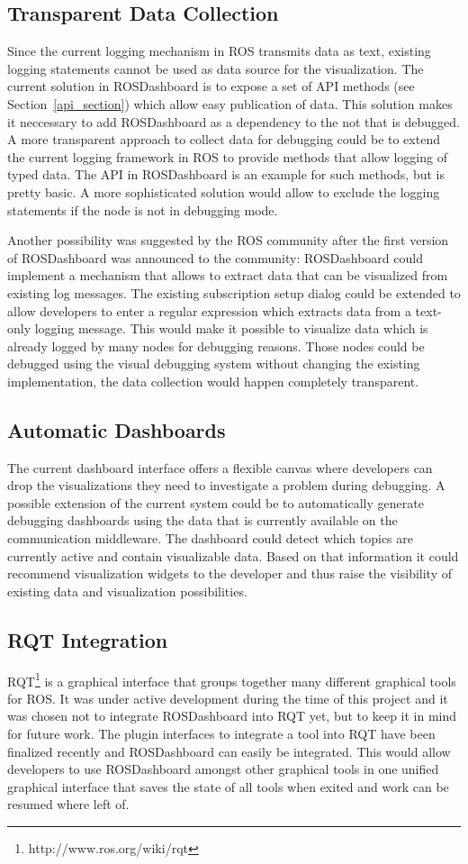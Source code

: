 \subsection{Transparent Data Collection}
Since the current logging mechanism in ROS transmits data as text, existing logging statements cannot be used as data source for the visualization. The current solution in ROSDashboard is to expose a set of API methods (see Section~\ref{api_section}) which allow easy publication of data. This solution makes it neccessary to add ROSDashboard as a dependency to the not that is debugged. A more transparent approach to collect data for debugging could be to extend the current logging framework in ROS to provide methods that allow logging of typed data. The API in ROSDashboard is an example for such methods, but is pretty basic. A more sophisticated solution would allow to exclude the logging statements if the node is not in debugging mode.

Another possibility was suggested by the ROS community after the first version of ROSDashboard was announced to the community: ROSDashboard could implement a mechanism that allows to extract data that can be visualized from existing log messages. The existing subscription setup dialog could be extended to allow developers to enter a regular expression which extracts data from a text-only logging message. This would make it possible to visualize data which is already logged by many nodes for debugging reasons. Those nodes could be debugged using the visual debugging system without changing the existing implementation, the data collection would happen completely transparent.

\subsection{Automatic Dashboards}
The current dashboard interface offers a flexible canvas where developers can drop the visualizations they need to investigate a problem during debugging. A possible extension of the current system could be to automatically generate debugging dashboards using the data that is currently available on the communication middleware. The dashboard could detect which topics are currently active and contain visualizable data. Based on that information it could recommend visualization widgets to the developer and thus raise the visibility of existing data and visualization possibilities.

\subsection{RQT Integration}
 RQT\footnote{http://www.ros.org/wiki/rqt} is a graphical interface that groups together many different graphical tools for ROS. It was under active development during the time of this project and it was chosen not to integrate ROSDashboard into RQT yet, but to keep it in mind for future work. The plugin interfaces to integrate a tool into RQT have been finalized recently and ROSDashboard can easily be integrated. This would allow developers to use ROSDashboard amongst other graphical tools in one unified graphical interface that saves the state of all tools when exited and work can be resumed where left of.

